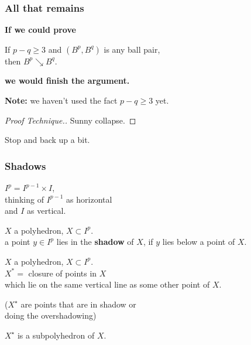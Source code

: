 \documentclass[14pt]{beamer}
\newcommand{\collapses}{\searrow}
\newcommand{\setbackgroundpicture}[1]{%
\usebackgroundtemplate{
\begin{pgfpicture}{0in}{0in}{\paperwidth}{\paperheight}
\pgfputat{\pgfxy(0,0)}{\texttt{[image: \#1]}}
\color{white}
\pgfsetfillopacity{0.8}
\pgfrect[fill]{\pgfxy(0,0)}{\pgfpoint{\paperwidth}{\paperheight}}
\end{pgfpicture}
}
}
\newcommand{\clearbackgroundpicture}{\usebackgroundtemplate{}}
\begin{document}
\begin{frame}
  \frametitle{All that remains}
  
  \textcolor{red!50!black}{\textbf{If we could prove}}
  \begin{lemma}
    If $p - q \geq 3$ and $(B^p,B^q)$ is any ball pair, \\
    then $B^p \collapses B^q$.
  \end{lemma}
  \textcolor{red!50!black}{\textbf{we would finish the argument.}}

  \pause\vfill
  \textbf{Note:} we haven't used the fact $p - q \geq 3$ yet.
  \pause\vfill
  \begin{proof}[Proof Technique.]
    Sunny collapse.
  \end{proof}
  \vfill\pause
\end{frame}


\setbackgroundpicture{stop-sign.jpg}
\begin{frame}
\pause
\vfill
\begin{center}
  Stop and back up a bit.
\end{center}
\end{frame}
\clearbackgroundpicture

\setbackgroundpicture{trees-with-shadows.jpg}
\begin{frame}
  \frametitle{Shadows}

  $I^p = I^{p-1} \times I$, \\
  thinking of $I^{p-1}$ as horizontal \\
  and $I$ as vertical.

  \vfill
  $X$ a polyhedron, $X \subset I^p$. \\
  a point $y \in I^p$ lies in the \textbf{shadow} of $X$, if $y$ lies
  below a point of $X$.
\end{frame}

\begin{frame}
  \begin{definition}
    $X$ a polyhedron, $X \subset I^p$. \\
    $X^\ast =$ closure of points in $X$ \\
    which lie on the same vertical line as some other point of $X$.
  \end{definition}
  \vfill\pause
  ($X^\star$ are points that are in shadow or \\
  \quad doing the overshadowing)
  \vfill\pause
  \begin{lemma}
    $X^\star$ is a subpolyhedron of $X$.
  \end{lemma}
\end{frame}
\end{document}
